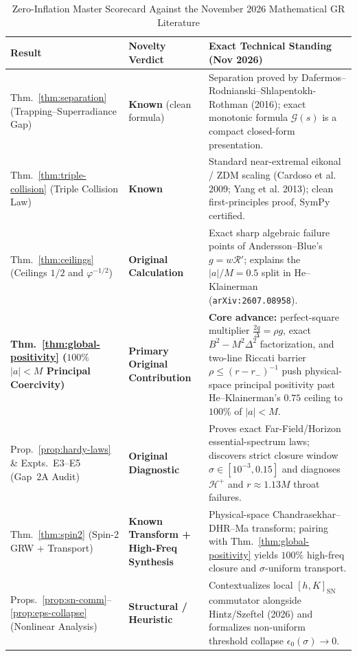 \documentclass[11pt, a4paper]{article}
\theoremstyle{remark}
\begin{document}
\begin{table}[h]
\centering
\caption{Zero-Inflation Master Scorecard Against the November 2026 Mathematical GR Literature}
\label{tab:master-scorecard}
\small
\begin{tabular}{@{}p{3.4cm}p{2.9cm}p{8.6cm}@{}}
\toprule
\textbf{Result} & \textbf{Novelty Verdict} & \textbf{Exact Technical Standing (Nov 2026)} \\
\midrule
Thm.~\ref{thm:separation} (Trapping--Superradiance Gap) & \textbf{Known} (clean formula) & Separation proved by Dafermos--Rodnianski--Shlapentokh-Rothman (2016); exact monotonic formula $\mathcal{G}(s)$ is a compact closed-form presentation. \\
\addlinespace[4pt]
Thm.~\ref{thm:triple-collision} (Triple Collision Law) & \textbf{Known} & Standard near-extremal eikonal / ZDM scaling (Cardoso et al. 2009; Yang et al. 2013); clean first-principles proof, SymPy certified. \\
\addlinespace[4pt]
Thm.~\ref{thm:ceilings} (Ceilings $1/2$ and $\varphi^{-1/2}$) & \textbf{Original Calculation} & Exact sharp algebraic failure points of Andersson--Blue's $g = w\mathcal{R}'$; explains the $|a|/M = 0.5$ split in He--Klainerman (\texttt{arXiv:2607.08958}). \\
\addlinespace[4pt]
\textbf{Thm.~\ref{thm:global-positivity} ($100\%$ $|a|<M$ Principal Coercivity)} & \textbf{Primary Original Contribution} & \textbf{Core advance:} perfect-square multiplier $\frac{2q}{\Delta} = \rho g$, exact $B^2 - M^2\Delta^2$ factorization, and two-line Riccati barrier $\rho \le (r-r_-)^{-1}$ push physical-space principal positivity past He--Klainerman's $0.75$ ceiling to $100\%$ of $|a|<M$. \\
\addlinespace[4pt]
Prop.~\ref{prop:hardy-laws} \& Expts.~E3--E5 (Gap~2A Audit) & \textbf{Original Diagnostic} & Proves exact Far-Field/Horizon essential-spectrum laws; discovers strict closure window $\sigma \in [10^{-3}, 0.15]$ and diagnoses $\mathcal{H}^+$ and $r \approx 1.13M$ throat failures. \\
\addlinespace[4pt]
Thm.~\ref{thm:spin2} (Spin-2 GRW + Transport) & \textbf{Known Transform + High-Freq Synthesis} & Physical-space Chandrasekhar--DHR--Ma transform; pairing with Thm.~\ref{thm:global-positivity} yields $100\%$ high-freq closure and $\sigma$-uniform transport. \\
\addlinespace[4pt]
Props.~\ref{prop:sn-comm}--\ref{prop:eps-collapse} (Nonlinear Analysis) & \textbf{Structural / Heuristic} & Contextualizes local $[h, K]_{\mathrm{SN}}$ commutator alongside Hintz/Szeftel (2026) and formalizes non-uniform threshold collapse $\epsilon_0(\sigma) \to 0$. \\
\bottomrule
\end{tabular}
\end{table}
\end{document}
